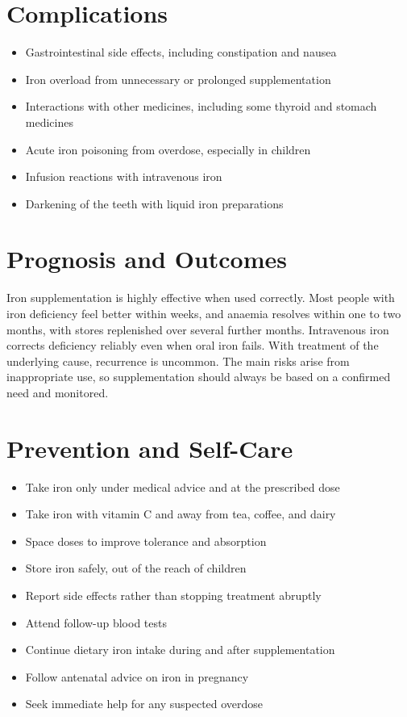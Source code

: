 \section*{Complications}
\begin{itemize}
    \item Gastrointestinal side effects, including constipation and nausea
    \item Iron overload from unnecessary or prolonged supplementation
    \item Interactions with other medicines, including some thyroid and stomach medicines
    \item Acute iron poisoning from overdose, especially in children
    \item Infusion reactions with intravenous iron
    \item Darkening of the teeth with liquid iron preparations
\end{itemize}

\section*{Prognosis and Outcomes}
Iron supplementation is highly effective when used correctly. Most people with iron deficiency feel better within weeks, and anaemia resolves within one to two months, with stores replenished over several further months. Intravenous iron corrects deficiency reliably even when oral iron fails. With treatment of the underlying cause, recurrence is uncommon. The main risks arise from inappropriate use, so supplementation should always be based on a confirmed need and monitored.

\section*{Prevention and Self-Care}
\begin{itemize}
    \item Take iron only under medical advice and at the prescribed dose
    \item Take iron with vitamin C and away from tea, coffee, and dairy
    \item Space doses to improve tolerance and absorption
    \item Store iron safely, out of the reach of children
    \item Report side effects rather than stopping treatment abruptly
    \item Attend follow-up blood tests
    \item Continue dietary iron intake during and after supplementation
    \item Follow antenatal advice on iron in pregnancy
    \item Seek immediate help for any suspected overdose
\end{itemize}

